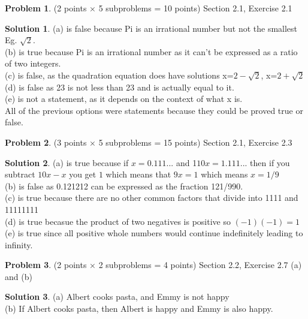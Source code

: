 \documentclass{article}
\theoremstyle{definition}
\newtheorem{problem}{Problem}
\newtheorem*{solution}{Solution}
\begin{document}
\newpage
\begin{problem} (2 points $\times$ 5 subproblems = 10 points) Section 2.1, Exercise 2.1
\end{problem}
\begin{solution}
  (a) is false because Pi is an irrational number but not the smallest Eg. {$\sqrt{2}$}.
  \\(b) is true because Pi is an irrational number as it can't be expressed as a ratio of two integers.
  \\(c) is false, as the quadration equation does have solutions x={$2 -\sqrt{2}$}, x={$2 +\sqrt{2}$}
  \\(d) is false as 23 is not less than 23 and is actually equal to it.
  \\(e) is not a statement, as it depends on the context of what x is. 
  \\All of the previous options were statements because they could be proved true or false.
\end{solution}

\newpage
\begin{problem} (3 points $\times$ 5 subproblems = 15 points) Section 2.1, Exercise 2.3
\end{problem}
\begin{solution}
  (a) is true because if {$x = 0.111...$} and 1{$10x = 1.111...$} then if you subtract {$10x-x$} you get {$1$} which means that {$9x=1$} which means {$x=1/9$}
  \\(b) is false as 0.121212 can be expressed as the fraction 121/990.
  \\(c) is true because there are no other common factors that divide into 1111 and 11111111
  \\(d) is true becasue the product of two negatives is positive so {$(-1)(-1) = 1$}
  \\(e) is true since all positive whole numbers would continue indefinitely leading to infinity.
\end{solution}

\newpage
\begin{problem} (2 points $\times$ 2 subproblems = 4 points) Section 2.2, Exercise 2.7 (a) and (b)
\end{problem}
\begin{solution}
  (a) Albert cooks pasta, and Emmy is not happy
  \\(b) If Albert cooks pasta, then Albert is happy and Emmy is also happy.
\end{solution}
\end{document}
